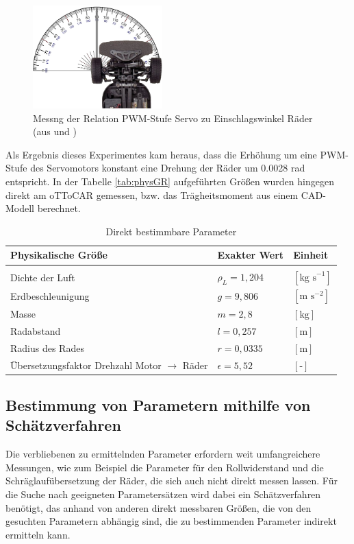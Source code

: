\begin{figure}[ht]
	\centering
	\includegraphics[width=5cm]{Bilder/u1Messung.png}
	\caption[Messng der Relation PWM-Stufe Servo zu Einschlagswinkel Räder]
		{Messng der Relation PWM-Stufe Servo zu Einschlagswinkel Räder (aus \cite{TT01} und \cite{Wim})}
	\label{pict:u1Mess}
\end{figure}

Als Ergebnis dieses Experimentes kam heraus, dass die Erhöhung um eine PWM-Stufe des Servomotors konstant eine Drehung der Räder um 0.0028 rad entspricht. In der Tabelle \ref{tab:physGR} aufgeführten Größen wurden hingegen direkt am oTToCAR gemessen, bzw. das Trägheitsmoment aus einem CAD-Modell \cite{TimMar} berechnet. 

\begin{table}[h!]
\centering
\begin{tabularx}{\columnwidth}{m{6cm}|m{4cm}|X}
  \textbf{Physikalische Größe} & \textbf{Exakter Wert}& \textbf{Einheit}\\\hline\hline 
	\rule{0pt}{1mm} & &\\
	Dichte der Luft & $\rho_{L}=1,204$ & $[\text{kg s}^{-1} ]$\\
	Erdbeschleunigung& $g=9,806$ & $[\text{m s}^{-2}]$\\
	Masse& $m=2,8$ & $[\text{kg}]$\\
  	Radabstand& $l=0,257$ & $[\text{m}]$\\
	Radius des Rades & $r=0,0335$ & $[\text{m}]$\\
	Übersetzungsfaktor Drehzahl Motor $\rightarrow$ Räder  & $\epsilon=5,52$ & $[\text{-}]$
\end{tabularx}
\caption{Direkt bestimmbare Parameter \label{tab:Pardir}}
\end{table} 

\subsection{Bestimmung von Parametern mithilfe von Schätzverfahren}
Die verbliebenen zu ermittelnden Parameter erfordern weit umfangreichere Messungen, wie zum Beispiel die Parameter für den Rollwiderstand und die Schräglaufübersetzung der Räder, die sich auch nicht direkt messen lassen. Für die Suche nach geeigneten Parametersätzen wird dabei ein Schätzverfahren benötigt, das anhand von anderen direkt messbaren Größen, die von den gesuchten Parametern abhängig sind, die zu bestimmenden Parameter indirekt ermitteln kann. 

